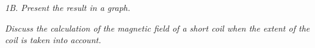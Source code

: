 \documentclass[../Elmag-labhefte-2020.tex]{subfiles}
\begin{document}

\emph{1B. Present the result in a graph.}

\emph{Discuss the calculation of the magnetic field of a short coil when the extent of the coil is taken into account.}
\end{document}
